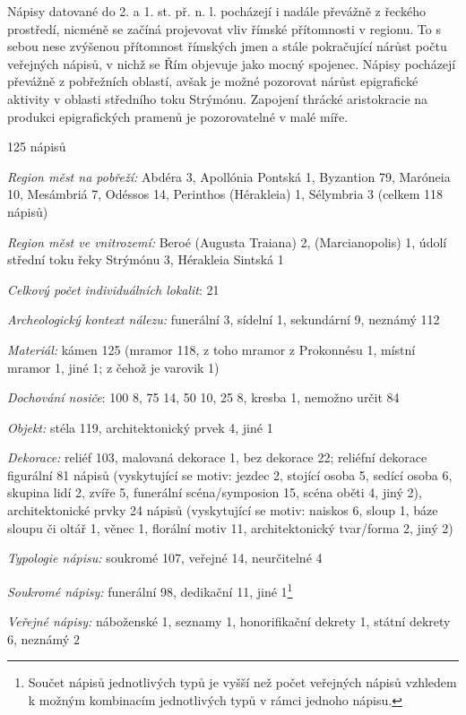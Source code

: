 Nápisy datované do 2. a 1. st. př. n. l. pocházejí i nadále převážně z řeckého prostředí, nicméně se začíná projevovat vliv římské přítomnosti v regionu. To s sebou nese zvýšenou přítomnost římských jmen a stále pokračující nárůst počtu veřejných nápisů, v nichž se Řím objevuje jako mocný spojenec. Nápisy pocházejí převážně z pobřežních oblastí, avšak je možné pozorovat nárůst epigrafické aktivity v oblasti středního toku Strýmónu. Zapojení thrácké aristokracie na produkci epigrafických pramenů je pozorovatelné v malé míře.

\placetable[none]{}
\starttable[|l|]
\HL
{} 125 nápisů

{\em Region měst na pobřeží:} Abdéra 3, Apollónia Pontská 1, Byzantion 79, Maróneia 10, Mesámbriá 7, Odéssos 14, Perinthos (Hérakleia) 1, Sélymbria 3 (celkem 118 nápisů)

{\em Region měst ve vnitrozemí:} Beroé (Augusta Traiana) 2, (Marcianopolis) 1, údolí střední toku řeky Strýmónu 3, Hérakleia Sintská 1

{\em Celkový počet individuálních lokalit}: 21

{\em Archeologický kontext nálezu:} funerální 3, sídelní 1, sekundární 9, neznámý 112

{\em Materiál:} kámen 125 (mramor 118, z toho mramor z Prokonnésu 1, místní mramor 1, jiné 1; z čehož je varovik 1)

{\em Dochování nosiče}: 100  8, 75  14, 50  10, 25  8, kresba 1, nemožno určit 84

{\em Objekt:} stéla 119, architektonický prvek 4, jiné 1

{\em Dekorace:} reliéf 103, malovaná dekorace 1, bez dekorace 22; reliéfní dekorace figurální 81 nápisů (vyskytující se motiv: jezdec 2, stojící osoba 5, sedící osoba 6, skupina lidí 2, zvíře 5, funerální scéna/symposion 15, scéna oběti 4, jiný 2), architektonické prvky 24 nápisů (vyskytující se motiv: naiskos 6, sloup 1, báze sloupu či oltář 1, věnec 1, florální motiv 11, architektonický tvar/forma 2, jiný 2)

{\em Typologie nápisu:} soukromé 107, veřejné 14, neurčitelné 4

{\em Soukromé nápisy:} funerální 98, dedikační 11, jiné 1\footnote{Součet nápisů jednotlivých typů je vyšší než počet veřejných nápisů vzhledem k možným kombinacím jednotlivých typů v rámci jednoho nápisu.}

{\em Veřejné nápisy:} náboženské 1, seznamy 1, honorifikační dekrety 1, státní dekrety 6, neznámý 2


